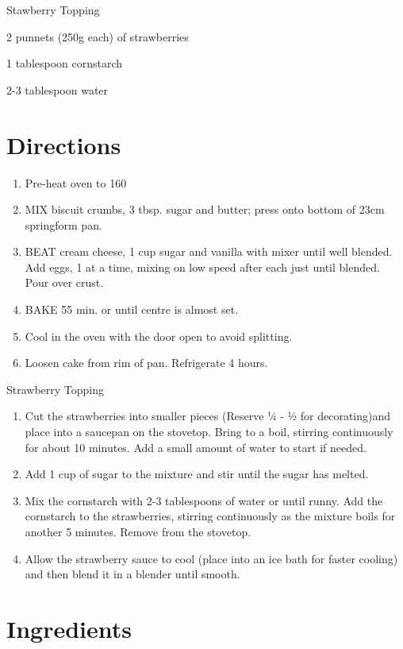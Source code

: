 Stawberry Topping
\begin{ingredients-list}
	\item 2 punnets (250g each) of strawberries
	\item 1 tablespoon cornstarch
	\item 2-3 tablespoon water
\end{ingredients-list}

\section*{Directions}
\begin{enumerate}
	\item Pre-heat oven to 160 \textcelsius
	\item MIX biscuit crumbs, 3 tbsp. sugar and butter; press onto bottom of 23cm springform pan.
	\item BEAT cream cheese, 1 cup sugar and vanilla with mixer until well blended.
		Add eggs, 1 at a time, mixing on low speed after each just until blended. Pour over crust.
	\item BAKE 55 min. or until centre is almost set.
	\item Cool in the oven with the door open to avoid splitting.
	\item Loosen cake from rim of pan. Refrigerate 4 hours.
\end{enumerate}
	Strawberry Topping
\begin{enumerate}
	\item Cut the strawberries into smaller pieces (Reserve 1⁄4 - 1⁄2 for decorating)and place into a saucepan on the stovetop.
		Bring to a boil, stirring continuously for about 10 minutes. Add a small amount of water to start if needed.
	\item Add 1 cup of sugar to the mixture and stir until the sugar has melted.
	\item Mix the cornstarch with 2-3 tablespoons of water or until runny.
		Add the cornstarch to the strawberries, stirring continuously as the mixture boils for another 5 minutes.
		Remove from the stovetop.
	\item Allow the strawberry sauce to cool (place into an ice bath for faster cooling) and then blend	it in a blender until smooth.
\end{enumerate}


\bigskip
\section*{Ingredients}

